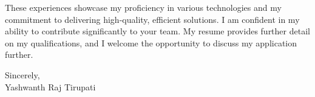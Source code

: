 \documentclass[letterpaper,11pt]{article}
\begin{document}
\begin{flushleft}
\vspace{12pt}

These experiences showcase my proficiency in various technologies and my commitment to delivering high-quality, efficient solutions. I am confident in my ability to contribute significantly to your team. My resume provides further detail on my qualifications, and I welcome the opportunity to discuss my application further.

\vspace{20pt}

Sincerely, \\
Yashwanth Raj Tirupati

\end{flushleft}
\end{document}
